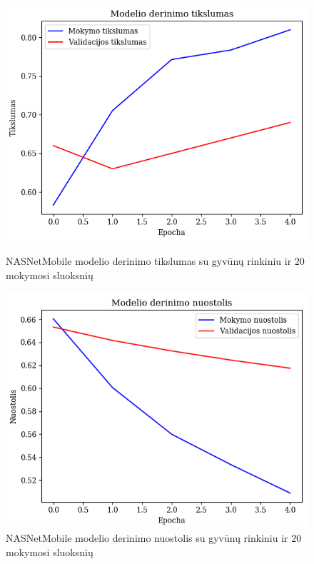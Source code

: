 \documentclass{VUMIFPSbakalaurinis}
\begin{document}
\begin{figure}[!htbp]
    \centering
    \begin{minipage}[b]{0.48\textwidth}
      \includegraphics[width=\textwidth]{img/GrapthsNEW/Small/animal/20/Acc_DC_S_20.png}
      \caption{NASNetMobile modelio derinimo tikslumas su gyvūnų rinkiniu ir 20 mokymosi sluoksnių}
    \end{minipage}
    \hspace{2mm}
    \begin{minipage}[b]{0.48\textwidth}
      \includegraphics[width=\textwidth]{img/GrapthsNEW/Small/animal/20/Loss_DC_S_20.png}
      \caption{NASNetMobile modelio derinimo nuostolis su gyvūnų rinkiniu ir 20 mokymosi sluoksnių}
    \end{minipage}
\end{figure}
\end{document}
